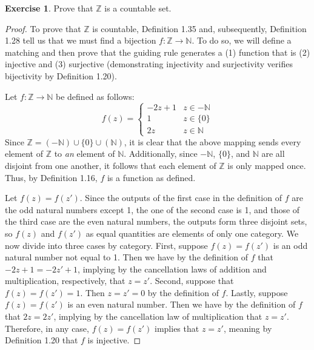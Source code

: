 \documentclass[titlepage]{article}
\newcounter{script}
\theoremstyle{definition}
\newtheorem{exercise}{Exercise}[script]
\newcommand{\N}{\mathbb{N}}
\newcommand{\Z}{\mathbb{Z}}
\begin{document}
\begin{exercise}
    Prove that $\Z$ is a countable set.
    \begin{proof}
        To prove that $\Z$ is countable, Definition 1.35 and, subsequently, Definition 1.28 tell us that we must find a bijection $f:\Z\to\N$. To do so, we will define a matching and then prove that the guiding rule generates a (1) function that is (2) injective and (3) surjective (demonstrating injectivity and surjectivity verifies bijectivity by Definition 1.20).\par
        Let $f:\Z\to\N$ be defined as follows:
        \begin{equation*}
            f(z) =
            \begin{cases}
                -2z+1 & z\in-\N\\
                1 & z\in\{0\}\\
                2z & z\in\N
            \end{cases}
        \end{equation*}
        Since $\Z=(-\N)\cup\{0\}\cup(\N)$, it is clear that the above mapping sends every element of $\Z$ to \emph{an} element of $\N$. Additionally, since $-\N$, $\{0\}$, and $\N$ are all disjoint from one another, it follows that each element of $\Z$ is only mapped once. Thus, by Definition 1.16, $f$ is a function as defined.\par
        Let $f(z)=f(z')$. Since the outputs of the first case in the definition of $f$ are the odd natural numbers except 1, the one of the second case is 1, and those of the third case are the even natural numbers, the outputs form three disjoint sets, so $f(z)$ and $f(z')$ as equal quantities are elements of only one category. We now divide into three cases by category. First, suppose $f(z)=f(z')$ is an odd natural number not equal to 1. Then we have by the definition of $f$ that $-2z+1=-2z'+1$, implying by the cancellation laws of addition and multiplication, respectively, that $z=z'$. Second, suppose that $f(z)=f(z')=1$. Then $z=z'=0$ by the definition of $f$. Lastly, suppose $f(z)=f(z')$ is an even natural number. Then we have by the definition of $f$ that $2z=2z'$, implying by the cancellation law of multiplication that $z=z'$. Therefore, in any case, $f(z)=f(z')$ implies that $z=z'$, meaning by Definition 1.20 that $f$ is injective.\par

\end{proof}
\end{exercise}
\end{document}
